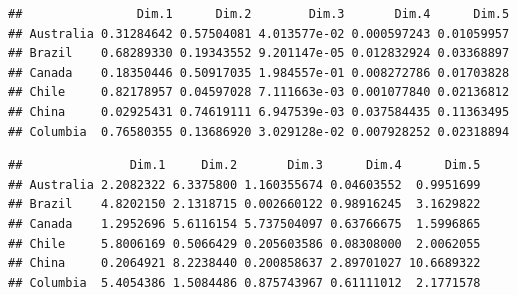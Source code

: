 \documentclass[11pt,preprint, authoryear]{elsarticle}
\numberwithin{equation}{section}
\numberwithin{figure}{section}
\numberwithin{table}{section}
\begin{document}
\begin{verbatim}
##                Dim.1      Dim.2        Dim.3       Dim.4      Dim.5
## Australia 0.31284642 0.57504081 4.013577e-02 0.000597243 0.01059957
## Brazil    0.68289330 0.19343552 9.201147e-05 0.012832924 0.03368897
## Canada    0.18350446 0.50917035 1.984557e-01 0.008272786 0.01703828
## Chile     0.82178957 0.04597028 7.111663e-03 0.001077840 0.02136812
## China     0.02925431 0.74619111 6.947539e-03 0.037584435 0.11363495
## Columbia  0.76580355 0.13686920 3.029128e-02 0.007928252 0.02318894
\end{verbatim}

\begin{verbatim}
##               Dim.1     Dim.2       Dim.3      Dim.4      Dim.5
## Australia 2.2082322 6.3375800 1.160355674 0.04603552  0.9951699
## Brazil    4.8202150 2.1318715 0.002660122 0.98916245  3.1629822
## Canada    1.2952696 5.6116154 5.737504097 0.63766675  1.5996865
## Chile     5.8006169 0.5066429 0.205603586 0.08308000  2.0062055
## China     0.2064921 8.2238440 0.200858637 2.89701027 10.6689322
## Columbia  5.4054386 1.5084486 0.875743967 0.61111012  2.1771578
\end{verbatim}
\end{document}
